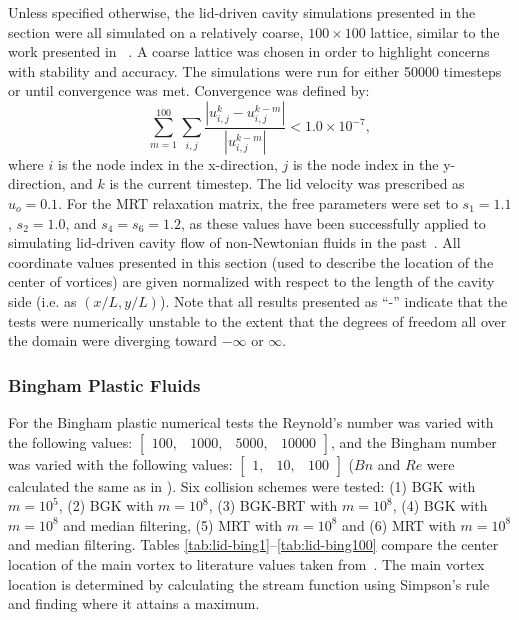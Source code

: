 Unless specified otherwise, the lid-driven cavity simulations presented in the section were all simulated on a relatively coarse, $100 \times 100$ lattice, similar to the work presented in ~\cite{brownlee2008nonequilibrium}.
A coarse lattice was chosen in order to highlight concerns with stability and accuracy.
The simulations were run for either 50000 timesteps or until convergence was met.
Convergence was defined by:
\begin{equation} \label{eq:convergence}
\sum_{m=1}^{100} \sum_{i, j} \frac{|u_{i, j}^k - u_{i, j}^{k-m}|}{|u_{i, j}^{k-m}|} < 1.0 \times 10^{-7},
\end{equation}
\noindent where $i$ is the node index in the x-direction, $j$ is the node index in the y-direction, and $k$ is the current timestep.
The lid velocity was prescribed as $u_o = 0.1$.
For the MRT relaxation matrix, the free parameters were set to $s_1 = 1.1$, $s_2 = 1.0$, and $s_4 = s_6 = 1.2$, as these values have been successfully applied to simulating lid-driven cavity flow of non-Newtonian fluids in the past~\cite{chen2014simulations,li2014simulation}.
All coordinate values presented in this section (used to describe the location of the center of vortices) are given normalized with respect to the length of the cavity side (i.e. as $(x / L, y / L)$).
Note that all results presented as ``-'' indicate that the tests were numerically unstable to the extent that the degrees of freedom all over the domain were diverging toward $-\infty$ or $\infty$.

\subsubsection{Bingham Plastic Fluids}

For the Bingham plastic numerical tests the Reynold's number was varied with the following values: $\begin{bmatrix}100,&1000,&5000,&10000\end{bmatrix}$, and the Bingham number was varied with the following values: $\begin{bmatrix}1,&10,&100\end{bmatrix}$ ($Bn$ and $Re$ were calculated the same as in ).
Six collision schemes were tested: (1) BGK with $m = 10^5$, (2) BGK with $m = 10^8$, (3) BGK-BRT with $m = 10^8$, (4) BGK with $m = 10^8$ and median filtering, (5) MRT with $m = 10^8$ and (6) MRT with $m = 10^8$ and median filtering.
Tables \ref{tab:lid-bing1}--\ref{tab:lid-bing100} compare the center location of the main vortex to literature values taken from~\citet{syrakos2014performance}.
The main vortex location is determined by calculating the stream function using Simpson's rule and finding where it attains a maximum.

